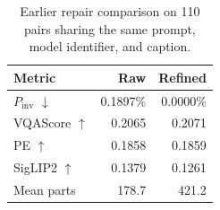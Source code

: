 \begin{table}[t]
\centering
\small
\begin{tabular}{lrr}
\toprule
Metric & Raw & Refined \\
\midrule
$P_{\mathrm{inv}}$ $\downarrow$ & 0.1897\% & 0.0000\% \\
VQAScore $\uparrow$ & 0.2065 & 0.2071 \\
PE $\uparrow$ & 0.1858 & 0.1859 \\
SigLIP2 $\uparrow$ & 0.1379 & 0.1261 \\
Mean parts & 178.7 & 421.2 \\
\bottomrule
\end{tabular}
\caption{Earlier repair comparison on 110 pairs sharing the same prompt, model identifier, and caption.}
\label{tab:raw-refined}
\end{table}
